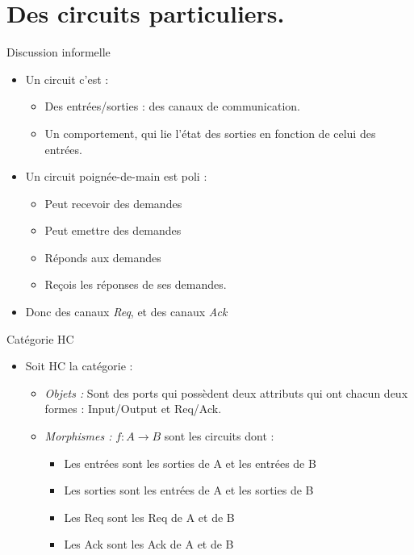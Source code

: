 \documentclass{beamer}
\begin{document}
\section{Des circuits particuliers.}

\begin{frame}{Discussion informelle}
\begin{itemize}
\item Un circuit c'est :
\begin{itemize}
\item Des entrées/sorties : des canaux de communication.
\item Un comportement, qui lie l'état des sorties en fonction de celui des
entrées.
\end{itemize}
\pause
\item Un circuit poignée-de-main est 
\pause
poli :
\begin{itemize}
\pause
\item Peut recevoir des demandes
\item Peut emettre des demandes
\item Réponds aux demandes
\item Reçois les réponses de ses demandes. 
\pause
\end{itemize}
\item Donc des canaux \emph{Req}, et des canaux \emph{Ack}
\end{itemize}
\end{frame}

\begin{frame}{Catégorie HC}
\begin{itemize}
\item Soit HC la catégorie :
\begin{itemize}
\item \emph{Objets :} Sont des ports qui possèdent deux attributs qui ont chacun
deux formes : Input/Output et Req/Ack. 
\item \emph{Morphismes :} $f : A \rightarrow B$ sont les circuits dont :  
\begin{itemize}
\item Les entrées sont les sorties de A et les entrées de B
\item Les sorties sont les entrées de A et les sorties de B
\item Les Req sont les Req de A et de B
\item Les Ack sont les Ack de A et de B
\end{itemize}
\end{itemize}
\end{itemize}
\end{frame}
\end{document}
